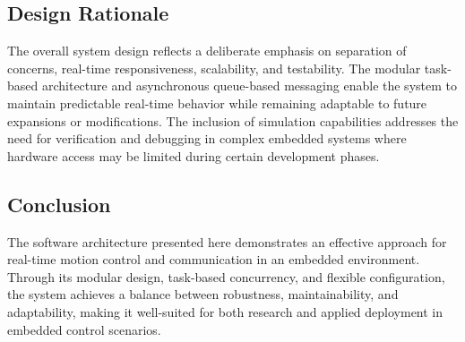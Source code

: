 \subsection{Design Rationale}
The overall system design reflects a deliberate emphasis on separation of concerns, real-time responsiveness, scalability, and testability. The modular task-based architecture and asynchronous queue-based messaging enable the system to maintain predictable real-time behavior while remaining adaptable to future expansions or modifications. The inclusion of simulation capabilities addresses the need for verification and debugging in complex embedded systems where hardware access may be limited during certain development phases.

\subsection{Conclusion}
The software architecture presented here demonstrates an effective approach for real-time motion control and communication in an embedded environment. Through its modular design, task-based concurrency, and flexible configuration, the system achieves a balance between robustness, maintainability, and adaptability, making it well-suited for both research and applied deployment in embedded control scenarios.